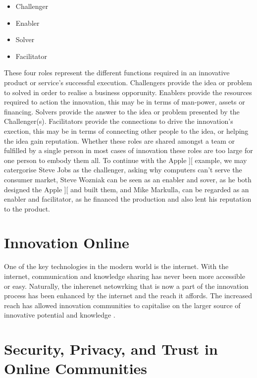\begin{itemize}
	\item Challenger
	\item Enabler
	\item Solver
	\item Facilitator
\end{itemize}

These four roles represent the different functions required in an innovative product or service's successful execution. Challengers provide the idea or problem to solved in order to realise a business opporunity. Enablers provide the resources required to action the innovation, this may be in terms of man-power, assets or financing. Solvers provide the answer to the idea or problem presented by the Challenger(s). Facilitators provide the connections to drive the innovation's exection, this may be in terms of connecting other people to the idea, or helping the idea gain reputation. Whether these roles are shared amongst a team or fulfilled by a single person in most cases of innovation these roles are too large for one person to embody them all. To continue with the Apple ][ example, we may catergorise Steve Jobs as the challenger, asking why computers can't serve the consumer market, Steve Wozniak can be seen as an enabler and sover, as he both designed the Apple ][ and built them, and Mike Markulla, can be regarded as an enabler and facilitator, as he financed the production and also lent his reputation to the product. 

\section{Innovation Online}
One of the key technologies in the modern world is the internet. With the internet, communication and knowledge sharing has never been more accessible or easy. Naturally, the inherenet netowrking that is now a part of the innovation process has been enhanced by the internet and the reach it affords. The increased reach has allowed innovation communities to capitalise on the larger source of innovative potential and knowledge \cite{hautz2010establish}.

\section{Security, Privacy, and Trust in Online Communities}

